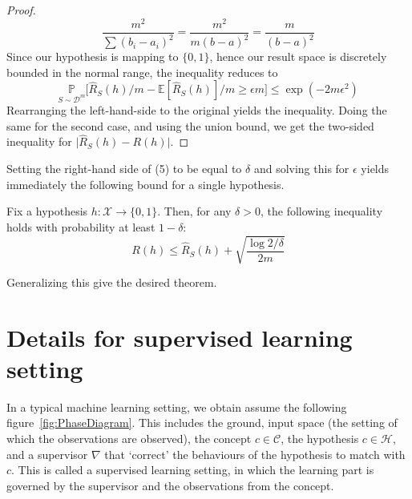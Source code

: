 \documentclass[twoside,10pt]{article}
\begin{document}
\begin{proof}
\begin{equation*}
        \frac{m^{2}}{\sum (b_{i} - a_{i})^{2}} = \frac{m^{2}}{m(b-a)^{2}} = \frac{m}{(b-a)^{2}}
    \end{equation*}
    Since our hypothesis is mapping to $\{0,1\}$, hence our result space is discretely bounded in the normal range, the inequality reduces to 
    \begin{equation}
        \underset{S\sim \mathcal{D}^{m}}{\mathbb{P}} \Big[ \hat{R}_{S}(h)/m - \mathbb{E}[\hat{R}_{S}(h)]/m \geq \epsilon m \Big] \leq \exp{\left(-2m\epsilon^{2}\right)}
    \end{equation}
    Rearranging the left-hand-side to the original yields the inequality. Doing the same for the second case, and using the union bound, we get the two-sided inequality for $\lvert \hat{R}_{S}(h) - R(h)\rvert$. 
\end{proof}

Setting the right-hand side of (5) to be equal to $\delta$ and solving this for $\epsilon$ yields immediately the following bound for a single hypothesis. 

\begin{col}
    Fix a hypothesis $h: \mathcal{X}\to \{0,1\}$. Then, for any $\delta > 0$, the following inequality holds with probability at least $1-\delta$: 
    \begin{equation}
        R(h) \leq \hat{R}_S(h) + \sqrt{\frac{\log{2/\delta}}{2m}}
    \end{equation}
\end{col}

Generalizing this give the desired theorem.

\section{Details for supervised learning setting}

In a typical machine learning setting, we obtain assume the following figure~\ref{fig:PhaseDiagram}. This includes the ground, input space (the setting of which the observations are observed), the concept $c\in\mathcal{C}$, the hypothesis $c\in \mathcal{H}$, and a supervisor $\nabla$ that `correct' the behaviours of the hypothesis to match with $c$. This is called a supervised learning setting, in which the learning part is governed by the supervisor and the observations from the concept.
\end{document}
